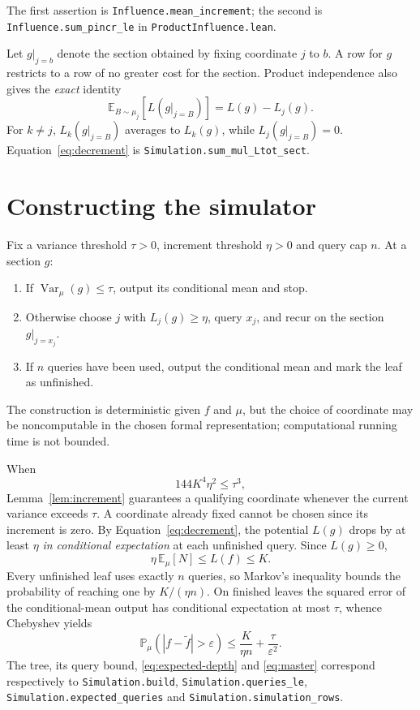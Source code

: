 \documentclass[11pt]{article}
\newcommand{\Var}{\operatorname{Var}}
\newcommand{\E}{\mathbb E}
\newcommand{\Prb}{\mathbb P}
\begin{document}
The first assertion is \texttt{Influence.mean\_increment}; the second is \texttt{Influence.sum\_pincr\_le} in \texttt{ProductInfluence.lean}.

Let $g|_{j=b}$ denote the section obtained by fixing coordinate $j$ to $b$. A row for $g$ restricts to a row of no greater cost for the section. Product independence also gives the \emph{exact} identity
\begin{equation}\label{eq:decrement}
\E_{B\sim\mu_j}\!\left[L(g|_{j=B})\right]=L(g)-L_j(g).
\end{equation}
For $k\ne j$, $L_k(g|_{j=B})$ averages to $L_k(g)$, while $L_j(g|_{j=B})=0$. Equation~\eqref{eq:decrement} is \texttt{Simulation.sum\_mul\_Ltot\_sect}.

\section{Constructing the simulator}
Fix a variance threshold $\tau>0$, increment threshold $\eta>0$ and query cap $n$. At a section $g$:
\begin{enumerate}[leftmargin=1.6em]
\item If $\Var_\mu(g)\le\tau$, output its conditional mean and stop.
\item Otherwise choose $j$ with $L_j(g)\ge\eta$, query $x_j$, and recur on the section $g|_{j=x_j}$.
\item If $n$ queries have been used, output the conditional mean and mark the leaf as unfinished.
\end{enumerate}
The construction is deterministic given $f$ and $\mu$, but the choice of coordinate may be noncomputable in the chosen formal representation; computational running time is not bounded.

When
\[
144K^4\eta^2\le\tau^3,
\]
Lemma~\ref{lem:increment} guarantees a qualifying coordinate whenever the current variance exceeds $\tau$. A coordinate already fixed cannot be chosen since its increment is zero. By Equation~\eqref{eq:decrement}, the potential $L(g)$ drops by at least $\eta$ \emph{in conditional expectation} at each unfinished query. Since $L(g)\ge0$,
\begin{equation}\label{eq:expected-depth}
\eta\,\E_\mu[N]\le L(f)\le K.
\end{equation}
Every unfinished leaf uses exactly $n$ queries, so Markov's inequality bounds the probability of reaching one by $K/(\eta n)$. On finished leaves the squared error of the conditional-mean output has conditional expectation at most $\tau$, whence Chebyshev yields
\begin{equation}\label{eq:master}
\Prb_\mu(|f-\widetilde f|>\varepsilon)
\le\frac{K}{\eta n}+\frac{\tau}{\varepsilon^2}.
\end{equation}
The tree, its query bound, \eqref{eq:expected-depth} and \eqref{eq:master} correspond respectively to
\texttt{Simulation.build}, \texttt{Simulation.queries\_le},
\texttt{Simulation.expected\_queries} and \texttt{Simulation.simulation\_rows}.
\end{document}
